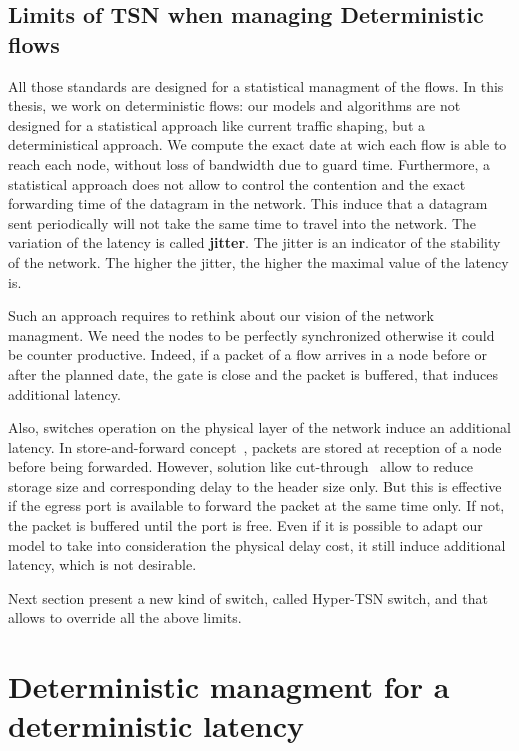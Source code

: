 \subsection{Limits of TSN when managing Deterministic flows}

All those standards are designed for a statistical managment of the flows. In this thesis, we work on deterministic flows: our models and algorithms are not designed for a statistical approach like current traffic shaping, but a deterministical approach. We compute the exact date at wich each flow is able to reach each node, without loss of bandwidth due to guard time. Furthermore, a statistical approach does not allow to control the contention and the exact forwarding time of the datagram in the network. This induce that a datagram sent periodically will not take the same time to travel into the network. The variation of the latency is called \textbf{jitter}. The jitter is an indicator of the stability of the network. The higher the jitter, the higher the maximal value of the latency is.

Such an approach requires to rethink about our vision of the network managment. We need the nodes to be perfectly synchronized otherwise it could be counter productive. Indeed, if a packet of a flow arrives in a node before or after the planned date, the gate is close and the packet is buffered, that induces additional latency.

Also, switches operation on the physical layer of the network induce an additional latency. In store-and-forward concept~\cite{tindell1992store}, packets are stored at reception of a node before being forwarded. However, solution like cut-through~\cite{kermani1979virtual} allow to reduce storage size and corresponding delay to the header size only. But this is effective if the egress port is available to forward the packet at the same time only. If not, the packet is buffered until the port is free. Even if it is possible to adapt our model to take into consideration the physical delay cost, it still induce additional latency, which is not desirable.

Next section present a new kind of switch, called Hyper-TSN switch, and that allows to override all the above limits.

\section{Deterministic managment for a deterministic latency}
\label{sec:platform}


